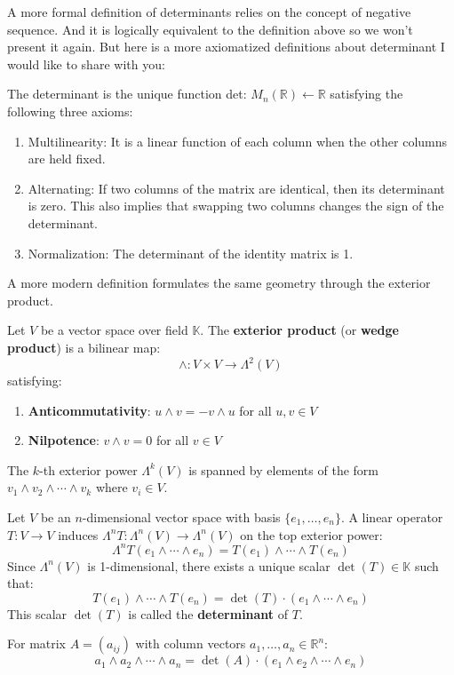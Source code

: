 A more formal definition of determinants relies on the concept of negative sequence. And it is logically equivalent to the definition above so we won't present it again. But here is a more axiomatized definitions about determinant I would like to share with you:

\begin{definition}
The determinant is the unique function det: $M_n(\mathbb{R}) \leftarrow \mathbb{R}$ satisfying the following three axioms:
\begin{enumerate}
    \item Multilinearity: It is a linear function of each column when the other columns are held fixed.
    \item Alternating: If two columns of the matrix are identical, then its determinant is zero. This also implies that swapping two columns changes the sign of the determinant.
    \item Normalization: The determinant of the identity matrix is 1.
\end{enumerate}
\end{definition}

A more modern definition formulates the same geometry through the exterior product.

\begin{definition}
Let $V$ be a vector space over field $\mathbb{K}$. The \textbf{exterior product} (or \textbf{wedge product}) is a bilinear map:
\[
\wedge: V \times V \to \Lambda^2(V)
\]
satisfying:
\begin{enumerate}
    \item \textbf{Anticommutativity}: $u \wedge v = -v \wedge u$ for all $u, v \in V$
    \item \textbf{Nilpotence}: $v \wedge v = 0$ for all $v \in V$
\end{enumerate}
The $k$-th exterior power $\Lambda^k(V)$ is spanned by elements of the form $v_1 \wedge v_2 \wedge \cdots \wedge v_k$ where $v_i \in V$.
\end{definition}

\begin{definition}
Let $V$ be an $n$-dimensional vector space with basis $\{e_1, \ldots, e_n\}$. A linear operator $T: V \to V$ induces $\Lambda^nT: \Lambda^n(V) \to \Lambda^n(V)$ on the top exterior power:
\[
\Lambda^nT(e_1 \wedge \cdots \wedge e_n) = T(e_1) \wedge \cdots \wedge T(e_n)
\]
Since $\Lambda^n(V)$ is 1-dimensional, there exists a unique scalar $\det(T) \in \mathbb{K}$ such that:
\[
T(e_1) \wedge \cdots \wedge T(e_n) = \det(T) \cdot (e_1 \wedge \cdots \wedge e_n)
\]
This scalar $\det(T)$ is called the \textbf{determinant} of $T$.

For matrix $A = (a_{ij})$ with column vectors $a_1, \ldots, a_n \in \mathbb{R}^n$:
\[
a_1 \wedge a_2 \wedge \cdots \wedge a_n = \det(A) \cdot (e_1 \wedge e_2 \wedge \cdots \wedge e_n)
\]
\end{definition}

